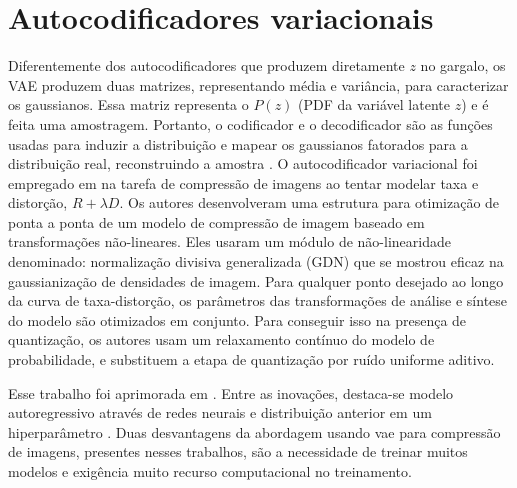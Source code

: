 
\section{Autocodificadores variacionais}



Diferentemente dos autocodificadores que produzem diretamente $z$ no gargalo, os VAE produzem duas matrizes, representando média e variância, para caracterizar os gaussianos. Essa matriz representa o $P(z)$ (PDF da variável latente $z$) e é feita uma amostragem. Portanto, o codificador e o decodificador são as funções usadas para induzir a distribuição e mapear os gaussianos fatorados para a distribuição real, reconstruindo a amostra \cite{DeliverableSeptember}. 
O autocodificador variacional foi empregado em  \cite{End2016Balle} na tarefa de compressão de imagens ao tentar modelar taxa e distorção, $R +\lambda D$. Os autores desenvolveram uma estrutura para otimização de ponta a ponta de um modelo de compressão de imagem baseado em transformações não-lineares.
Eles usaram um módulo de não-linearidade denominado: normalização divisiva generalizada (GDN) que se mostrou eficaz na gaussianização de densidades de imagem. 
Para qualquer ponto desejado ao longo da curva de taxa-distorção, os parâmetros das transformações de análise e síntese do modelo são otimizados em conjunto.
Para conseguir isso na presença de quantização, os autores usam  um relaxamento contínuo do modelo de probabilidade, e substituem a etapa de quantização por ruído uniforme aditivo. 

Esse trabalho foi aprimorada em  \cite{Variational2018Balle,Autoregressive2018Minnen}. Entre as inovações, destaca-se modelo autoregressivo através de redes neurais \cite{Autoregressive2018Minnen} e  distribuição anterior em um hiperparâmetro \cite{Autoregressive2018Minnen,Variational2018Balle}. Duas desvantagens da abordagem usando  \acrshort{vae} para compressão de imagens, presentes nesses trabalhos, são a necessidade de treinar muitos modelos e exigência muito recurso computacional no treinamento. 



